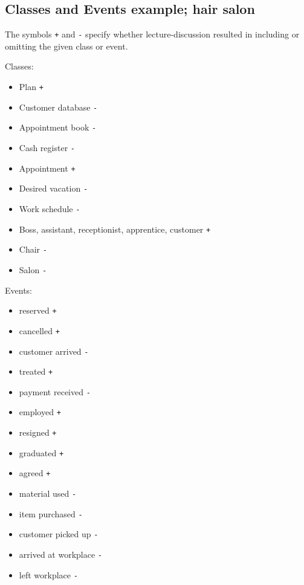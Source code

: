 \subsection{Classes and Events example; hair salon}
The symbols \texttt{+} and \texttt{-} specify whether lecture-discussion resulted in including or omitting the given class or event.

\begin{minipage}[t]{\textwidth}
    \begin{minipage}[t]{.5\textwidth}
        \noindent Classes:
        \begin{itemize}
            \item Plan \texttt{+}
            \item Customer database \texttt{-}
            \item Appointment book \texttt{-}
            \item Cash register \texttt{-}
            \item Appointment \texttt{+}
            \item Desired vacation \texttt{-}
            \item Work schedule \texttt{-}
            \item Boss, assistant, receptionist, apprentice, customer \texttt{+}
            \item Chair \texttt{-}
            \item Salon \texttt{-}
        \end{itemize}
    \end{minipage}%
    \begin{minipage}[t]{.5\textwidth}
        \noindent Events:
        \begin{itemize}
            \item reserved \texttt{+}
            \item cancelled \texttt{+}
            \item customer arrived \texttt{-}
            \item treated \texttt{+}
            \item payment received \texttt{-}
            \item employed \texttt{+}
            \item resigned \texttt{+}
            \item graduated \texttt{+}
            \item agreed \texttt{+}
            \item material used \texttt{-}
            \item item purchased \texttt{-}
            \item customer picked up \texttt{-}
            \item arrived at workplace \texttt{-}
            \item left workplace \texttt{-}
        \end{itemize}
    \end{minipage}
\end{minipage}


